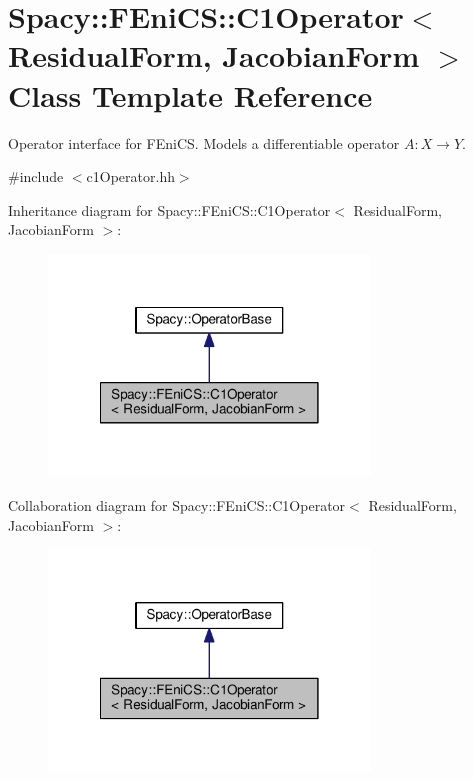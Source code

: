 \hypertarget{classSpacy_1_1FEniCS_1_1C1Operator}{\section{Spacy\-:\-:F\-Eni\-C\-S\-:\-:C1\-Operator$<$ Residual\-Form, Jacobian\-Form $>$ Class Template Reference}
\label{classSpacy_1_1FEniCS_1_1C1Operator}
}


Operator interface for F\-Eni\-C\-S. Models a differentiable operator $A:X\rightarrow Y$.  




{\ttfamily \#include $<$c1\-Operator.\-hh$>$}



Inheritance diagram for Spacy\-:\-:F\-Eni\-C\-S\-:\-:C1\-Operator$<$ Residual\-Form, Jacobian\-Form $>$\-:
\nopagebreak
\begin{figure}[H]
\begin{center}
\leavevmode
\includegraphics[width=242pt]{classSpacy_1_1FEniCS_1_1C1Operator__inherit__graph}
\end{center}
\end{figure}


Collaboration diagram for Spacy\-:\-:F\-Eni\-C\-S\-:\-:C1\-Operator$<$ Residual\-Form, Jacobian\-Form $>$\-:
\nopagebreak
\begin{figure}[H]
\begin{center}
\leavevmode
\includegraphics[width=242pt]{classSpacy_1_1FEniCS_1_1C1Operator__coll__graph}
\end{center}
\end{figure}
